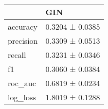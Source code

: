 \begin{tabular}{ll}
\toprule
 & GIN \\
\midrule
accuracy & 0.3204 ± 0.0385 \\
precision & 0.3309 ± 0.0513 \\
recall & 0.3231 ± 0.0346 \\
f1 & 0.3060 ± 0.0384 \\
roc_auc & 0.6819 ± 0.0234 \\
log_loss & 1.8019 ± 0.1288 \\
\bottomrule
\end{tabular}
